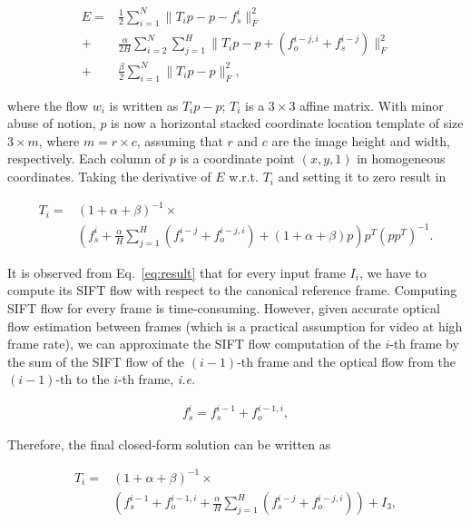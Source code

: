 \documentclass[10pt,journal]{IEEEtran}
\begin{document}
\begin{align}
	\label{data_affine}
E		=&\frac{1}{2}\sum_{i=1}^{N}\parallel{T_ip-p-f_s^i}\parallel_F^2
\\\label{smooth_affine}
				+&\frac{\alpha}{2H}\sum_{i=2}^{N}\sum_{j=1}^{H}\parallel{T_ip-p+(f_o^{i-j,i}+f_s^{i-j})}\parallel_F^2
\\\label{penalty_affine}
				+&\frac{\beta}{2}\sum_{i=1}^{N}\parallel{T_ip-p}\parallel_F^2,
\end{align} 

\noindent where the flow $w_i$ is written as $T_ip-p$; $T_i$ is a $3\times3$ affine matrix. With minor
 abuse of notion, $p$ is now a horizontal stacked coordinate location template of size $3\times m$, where $m=r\times c$, assuming that $r$ and $c$ are the image height and width, respectively. Each column of $p$ is a coordinate point $(x,y,1)$ in homogeneous coordinates. Taking the derivative of $E$ w.r.t. $T_i$ and setting it to zero result in 

\begin{equation}
\begin{aligned}
\label{eq:result}
T_i=&(1+\alpha+\beta)^{-1}\times \\
		&(f_s^i+\frac{\alpha}{H}\sum_{j=1}^H(f_s^{i-j}+f_o^{i-j,i})+(1+\alpha+\beta)p)p^T(pp^T)^{-1}.
\end{aligned}
\end{equation}

It is observed from Eq.~\eqref{eq:result} that for every input frame $I_i$, we have to compute its SIFT flow with respect to the canonical reference frame. Computing SIFT flow for every frame is time-consuming. However, given accurate optical flow estimation between frames (which is a practical assumption for video at high frame rate), we can approximate the SIFT flow computation of the $i$-th frame by the sum of the SIFT flow of the $(i-1)$-th frame and the optical flow from the $(i-1)$-th to the $i$-th frame, \textit{i.e.}

\begin{align}
\label{eq:approx}
f_s^i=f_s^{i-1}+f_o^{i-1,i},
\end{align}

Therefore, the final closed-form solution can be written as

\begin{align}
\label{eq:final}
T_i=&(1+\alpha+\beta)^{-1}\times \nonumber \\
		&(f_s^{i-1}+f_o^{i-1,i}+\frac{\alpha}{H}\sum_{j=1}^H(f_s^{i-j}+f_o^{i-j,i})) + I_3, \nonumber \\
\end{align}
\end{document}
